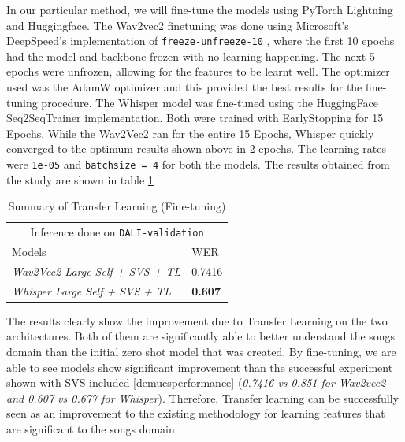 In our particular method, we will fine-tune the models using PyTorch Lightning and Huggingface. The Wav2vec2 finetuning was done using Microsoft's DeepSpeed's implementation of \texttt{freeze-unfreeze-10} , where the first 10 epochs had the model and backbone frozen with no learning happening. The next 5 epochs were unfrozen, allowing for the features to be learnt well. The optimizer used was the AdamW optimizer and this provided the best results for the fine-tuning procedure. The Whisper model was fine-tuned using the HuggingFace Seq2SeqTrainer implementation. Both were trained with EarlyStopping for 15 Epochs. While the Wav2Vec2 ran for the entire 15 Epochs, Whisper quickly converged to the optimum results shown above in 2 epochs. The learning rates were \texttt{1e-05} and \texttt{batchsize = 4} for both the models. The results obtained from the study are shown in table \ref{transferlearning-performance-table}

\renewcommand{\arraystretch}{2}
\setlength{\arrayrulewidth}{0.3mm}
\begin{table}[H]
\small
\begin{center}
\begin{tabular}{ |p{7cm}| p{3cm}| }
\multicolumn{2}{c}{Inference done on \texttt{DALI-validation}} \\
\cline{1-2}
 Models     & WER  \\
\hline  \hline
 \textit{Wav2Vec2 Large Self + SVS + TL}    & 0.7416  \\
 \textit{Whisper Large Self + SVS + TL}   & \textbf{0.607}  \\
\hline  \hline
\end{tabular} 
\caption{\label{transferlearning-performance-table} Summary of Transfer Learning (Fine-tuning)}
\end{center}
\end{table}


The results clearly show the improvement due to Transfer Learning on the two architectures. Both of them are significantly able to better understand the songs domain than the initial zero shot model that was created. By fine-tuning, we are able to see models show significant improvement than the successful experiment shown with SVS included \ref{demucsperformance} (\textit{0.7416 vs 0.851 for Wav2vec2 and 0.607 vs 0.677 for Whisper}). Therefore, Transfer learning can be successfully seen as an improvement to the existing methodology for learning features that are significant to the songs domain.


